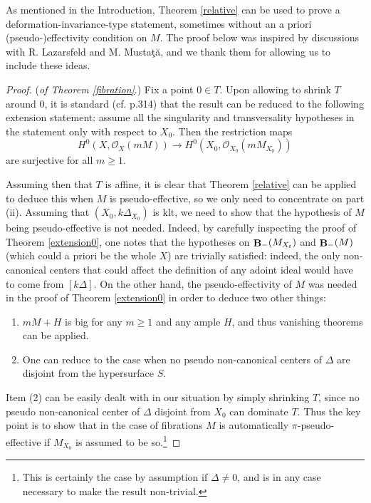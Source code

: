 \documentclass[11pt]{amsart}
\theoremstyle{plain}
\theoremstyle{definition}
\newcommand{\OO}{\mathcal  {O}}
\DeclareMathOperator{\BB}{{\bf B}}
\begin{document}
As mentioned in the Introduction, Theorem \ref{relative} can be used to prove a deformation-invariance-type statement, sometimes without an a priori (pseudo-)effectivity condition on $M$. The proof below was inspired by discussions with R. Lazarsfeld and M. Musta\c t\u a, and we thank them for allowing us to include these ideas.

\begin{proof} (\emph{of Theorem \ref{fibration}}.)
Fix a point $0\in T$. Upon allowing to shrink $T$ around $0$, it is standard (cf. \cite{positivity} p.314) that the result can be reduced to the 
following extension statement: assume all the singularity and transversality hypotheses in the statement only with 
respect to $X_0$. Then the restriction maps 
$$H^0 (X,  \OO_X (mM)) \longrightarrow H^0 (X_0, \OO_{X_0} (mM_{X_0}))$$
are surjective for all $m \ge 1$. 

Assuming then that $T$ is affine, it is clear that Theorem \ref{relative}  can be applied to deduce this when $M$ is pseudo-effective, so we only need to concentrate on part (ii). Assuming that $(X_0, k\Delta_{X_0})$ is klt, 
we need to show that the hypothesis of $M$ being pseudo-effective is not needed. Indeed, by carefully inspecting the proof of
Theorem \ref{extension0}, one notes that the hypotheses on $\BB_{-} (M_{X_t})$ and $\BB_{-} (M)$ (which could a priori be the whole $X$) are trivially satisfied: indeed, the only non-canonical centers that could affect the definition of any adoint ideal would have to 
come from $[k\Delta]$.
On the other hand, the pseudo-effectivity of $M$ was needed in the proof of Theorem \ref{extension0} in order to deduce two other things:
\begin{enumerate}
\item  $mM+ H$ is big for any $m\ge 1$ and any ample $H$, and thus 
vanishing theorems can be applied.
\item One can reduce to the case when no pseudo non-canonical centers of $\Delta$ are disjoint from the hypersurface $S$. 
\end{enumerate}
Item (2) can be easily dealt with in our situation by simply shrinking $T$, since no pseudo non-canonical center 
of $\Delta$ disjoint from $X_0$ can dominate $T$. Thus the key point is to show that in the case of 
fibrations $M$ is automatically $\pi$-pseudo-effective if $M_{X_0}$ is assumed to be so.\footnote{This is certainly the case by assumption if $\Delta \neq 0$, and is in any case necessary to make the result 
non-trivial.} 


\end{proof}
\end{document}
